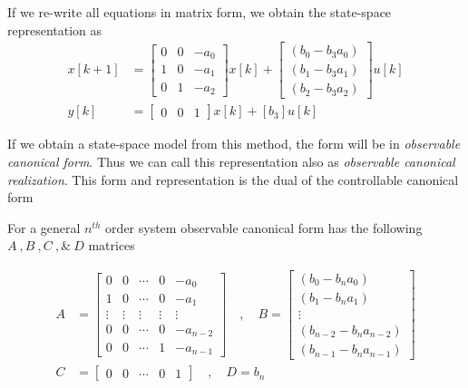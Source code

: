\documentclass[twoside]{article}
\begin{document}
%
If we re-write all equations in matrix form, we obtain the state-space representation as
%
\begin{align*}
	x[k+1] &= \left[ \begin{array}{ccc} 0 & 0 & -a_0  \\  1 & 0 & -a_1 \\  0 & 1 & -a_2 \end{array} \right] x[k] 
	+ \left[ \begin{array}{c} ( b_0 - b_3 a_0 ) \\ ( b_1 - b_3 a_1 ) \\ ( b_2 - b_3 a_2 ) \end{array} \right] u[k]
	\\
	y[k] &= \left[ \begin{array}{ccc} 0 & 0  & 1 \end{array} \right] x[k]
	+ \left[ b_3 \right] u[k]
\end{align*}

If we obtain a state-space model from this method, the form
will be in \textit{observable canonical form}. Thus we can call this representation also as 
\textit{observable canonical realization}. This form and
representation is the dual of the controllable canonical form

For a general $n^{th}$ order system observable
canonical form has the following $A \ ,  B \ ,  C \ , \& \ D$
matrices

\begin{align*}
A &= \left[ \begin{array}{ccccc} 0 & 0 & \cdots & 0 & -a_0 
              \\ 1 & 0 & \cdots & 0 & -a_1 
\\ \vdots & \vdots & \vdots & \vdots & \vdots
\\ 0 & 0 & \cdots & 0 & -a_{n-2}
    \\ 0 & 0 & \cdots & 1 & -a_{n-1} \end{array} \right]
\quad , \quad 
B = \left[ \begin{array}{c} (b_0 - b_n a_0)  \\ (b_1 - b_n
             a_1 ) \\ \vdots \\ (b_{n-2} - b_n a_{n-2} ) \\   (b_{n-1} - b_n
             a_{n-1}) 
\end{array} \right]
\\ C &= \left[ \begin{array}{ccccc} 0 & 0 & \cdots &  0 & 1 \end{array} \right]
\quad , \quad
D = b_n
\end{align*}
\end{document}
